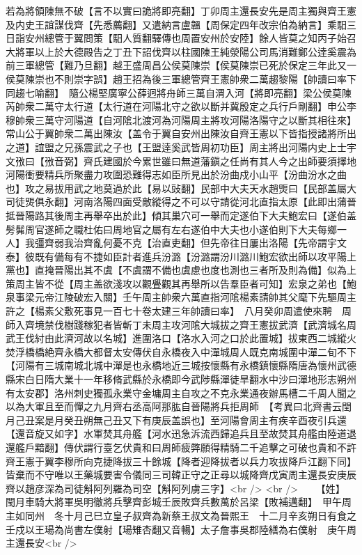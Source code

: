 若為將領陳無不破【言不以實曰詭將即亮翻】丁卯周主還長安先是周主獨與齊王憲及内史王誼謀伐齊【先悉薦翻】又遣納言盧韞【周保定四年改宗伯為納言】乘馹三日詣安州總管于翼問策【馹人質翻驛傳也周置安州於安陸】餘人皆莫之知丙子始召大將軍以上於大德殿告之丁丑下詔伐齊以柱國陳王純滎陽公司馬消難鄭公逹奚震為前三軍總管【難乃旦翻】越王盛周昌公侯莫陳崇【侯莫陳崇已死於保定三年此又一侯莫陳崇也不則崇字誤】趙王招為後三軍總管齊王憲帥衆二萬趨黎陽【帥讀曰率下同趨七喻翻】　隨公楊堅廣寧公薛迥將舟師三萬自渭入河【將即亮翻】梁公侯莫陳芮帥衆二萬守太行道【太行道在河陽北守之欲以斷并冀殷定之兵行戶剛翻】申公李穆帥衆三萬守河陽道【自河隂北渡河為河陽周主將攻河陽洛陽守之以斷其相往來】常山公于翼帥衆二萬出陳汝【盖令于翼自安州出陳汝自齊王憲以下皆指授諸將所出之道】誼盟之兄孫震武之子也【王盟逹奚武皆周初功臣】周主將出河陽内史上士宇文㢸曰【㢸音弼】齊氏建國於今累世雖曰無道藩鎭之任尚有其人今之出師要須擇地河陽衝要精兵所聚盡力攻圍恐難得志如臣所見出於汾曲戍小山平【汾曲汾水之曲也】攻之易拔用武之地莫過於此【易以䜴翻】民部中大夫天水趙煚曰【民部盖屬大司徒煚俱永翻】河南洛陽四面受敵縱得之不可以守請從河北直指太原【此即出蒲晉抵晉陽路其後周主再舉卒出於此】傾其巢穴可一舉而定遂伯下大夫鮑宏曰【遂伯盖髣髴周官遂師之職杜佑曰周地官之屬有左右遂伯中大夫也小遂伯則下大夫每鄉一人】我彊齊弱我治齊亂何憂不克【治直吏翻】但先帝往日屢出洛陽【先帝謂宇文泰】彼既有備每有不捷如臣計者進兵汾潞【汾潞謂汾川潞川鮑宏欲出師以攻平陽上黨也】直掩晉陽出其不虞【不虞謂不備也虞慮也度也測也三者所及則為備】似為上策周主皆不從【周主盖欲淺攻以觀舋觀其再舉所以告羣臣者可知】宏泉之弟也【鮑泉事梁元帝江陵破宏入關】壬午周主帥衆六萬直指河隂楊素請帥其父麾下先驅周主許之【楊素父敷死事見一百七十卷太建三年帥讀曰率】　八月癸卯周遣使來聘　周師入齊境禁伐樹踐稼犯者皆斬丁未周主攻河隂大城拔之齊王憲拔武濟【武濟城名周武王伐紂由此濟河故以名城】進圍洛口【洛水入河之口於此置城】拔東西二城縱火焚浮橋橋絶齊永橋大都督太安傳伏自永橋夜入中潬城周人既克南城圍中潬二旬不下【河陽有三城南城北城中潬是也永橋地近三城按懷縣有永橋鎮懷縣隋唐為懷州武德縣宋白日隋大業十一年移脩武縣於永橋即今武陟縣潬徒旱翻水中沙曰潬地形志朔州有太安郡】洛州刺史獨孤永業守金墉周主自攻之不克永業通夜辦馬槽二千周人聞之以為大軍且至而憚之九月齊右丞高阿那肱自晉陽將兵拒周師　【考異曰北齊書云閏月己丑案是月癸丑朔無己丑又下有庚辰盖誤也】至河陽會周主有疾辛酉夜引兵還【還音旋又如字】水軍焚其舟艦【河水迅急泝流西歸追兵且至故焚其舟艦由陸道退還艦戶黯翻】傳伏謂行臺乞伏貴和曰周師疲弊願得精騎二千追擊之可破也貴和不許齊王憲于翼李穆所向克捷降拔三十餘城【降者迎降拔者以兵力攻拔降戶江翻下同】皆棄而不守唯以王藥城要害令儀同三司韓正守之正尋以城降齊戊寅周主還長安庚辰齊以趙彦深為司徒斛阿列羅為司空【斛阿列虜三字】<br />
<br />
　　【姓】　閠月車騎大將軍吳明徹將兵擊齊彭城壬辰敗齊兵數萬於呂梁【敗補邁翻】　甲午周主如同州　冬十月己巳立皇子叔齊為新蔡王叔文為晉熙王　十二月辛亥朔日有食之　壬戍以王瑒為尚書左僕射【瑒雉杏翻又音暢】太子詹事吳郡陸繕為右僕射　庚午周主還長安<br />
